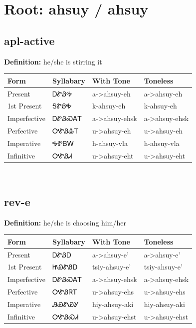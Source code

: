 \documentclass{article}%
\begin{document}
%
\normalsize%
\section*{Root: ahsuy / ahsuy}%
\subsection*{apl-active}%
\textbf{Definition: }%
he/she is stirring it%
\\[0.5em]%
\begin{tabular}{|l|l|l|l|}%
\hline%
\textbf{Form}&\textbf{Syllabary}&\textbf{With Tone}&\textbf{Toneless}\\%
\hline%
Present&ᎠᏑᏰᎭ&a{-}>ahsuy{-}eh&a{-}>ahsuy{-}eh\\%
1st Present&ᎦᏑᏰᎭ&k{-}ahsuy{-}eh&k{-}ahsuy{-}eh\\%
Imperfective&ᎠᏑᏰᏍᎪᎢ&a{-}>ahsuy{-}ehsk&a{-}>ahsuy{-}ehsk\\%
Perfective&ᎤᏑᏰᎲᎢ&u{-}>ahsuy{-}eh&u{-}>ahsuy{-}eh\\%
Imperative&ᎭᏑᏴᎳ&h{-}ahsuy{-}vla&h{-}ahsuy{-}vla\\%
Infinitive&ᎤᏑᏰᏗ&u{-}>ahsuy{-}eht&u{-}>ahsuy{-}eht\\%
\hline%
\end{tabular}%
\\[1em]%
\subsection*{rev-e}%
\textbf{Definition: }%
he/she is choosing him/her%
\\[0.5em]%
\begin{tabular}{|l|l|l|l|}%
\hline%
\textbf{Form}&\textbf{Syllabary}&\textbf{With Tone}&\textbf{Toneless}\\%
\hline%
Present&ᎠᏑᏰᎠ&a{-}>ahsuy{-}e'&a{-}>ahsuy{-}e'\\%
1st Present&ᏥᏯᏑᏰᎠ&tsiy{-}ahsuy{-}e'&tsiy{-}ahsuy{-}e'\\%
Imperfective&ᎠᏑᏰᏍᎪᎢ&a{-}>ahsuy{-}ehsk&a{-}>ahsuy{-}ehsk\\%
Perfective&ᎤᏑᏰᏒᎢ&u{-}>ahsuy{-}ehs&u{-}>ahsuy{-}ehs\\%
Imperative&ᎯᏯᏑᏯᎩ&hiy{-}ahsuy{-}aki&hiy{-}ahsuy{-}aki\\%
Infinitive&ᎤᏑᏰᏍᏗ&u{-}>ahsuy{-}ehst&u{-}>ahsuy{-}ehst\\%
\hline%
\end{tabular}%
\\[1em]%
\end{document}
